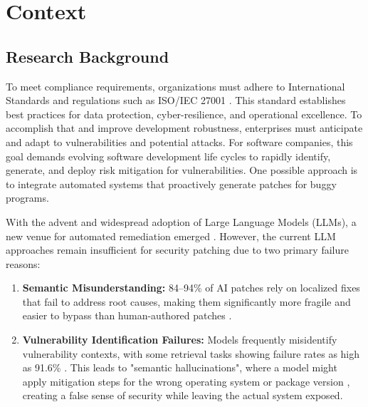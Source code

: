\documentclass[11pt, a4paper]{article}
\begin{document}
\section*{Context}
\subsection{Research Background}
To meet compliance requirements, organizations must adhere to International Standards and regulations such as ISO/IEC 27001 \cite{iso27001}. This standard establishes best practices for data protection, cyber-resilience, and operational excellence. 
To accomplish that and improve development robustness, enterprises must anticipate and adapt to vulnerabilities and potential attacks. 
For software companies, this goal demands evolving software development life cycles to rapidly identify, generate, and deploy risk mitigation for vulnerabilities. 
One possible approach is to integrate automated systems that proactively generate patches for buggy programs. 

With the advent and widespread adoption of Large Language Models (LLMs), a new venue for automated remediation emerged \cite{Xia_2024}. 
However, the current LLM approaches remain insufficient for security patching due to two primary failure reasons:

\begin{enumerate}[leftmargin=*, label=\arabic*.]

    \item \textbf{Semantic Misunderstanding:} 84–94\% of AI patches rely on localized fixes that fail to address root causes, making them significantly more fragile and easier to bypass than human-authored patches \cite{mahmud2025systematic}.

    \item \textbf{Vulnerability Identification Failures:} Models frequently misidentify vulnerability contexts, with some retrieval tasks showing failure rates as high as 91.6\% \cite{McClanahan2024Meets}. 
    This leads to "semantic hallucinations", where a model might apply mitigation steps for the wrong operating system \cite{McClanahan2024Meets} or package version \cite{zemicheal2024llm}, creating a false sense of security while leaving the actual system exposed.

\end{enumerate}
\end{document}
